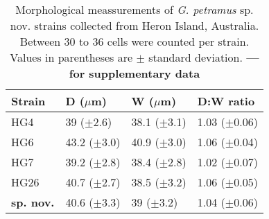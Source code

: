 \documentclass[12pt]{article}
\begin{document}
\FloatBarrier
\begin{table}
\caption{Morphological meassurements of \emph{G. petramus }sp. nov. strains collected from Heron Island, Australia. Between 30 to 36 cells were counted per strain. Values in parentheses are $\pm$ standard deviation. \textbf{--- for supplementary data}}
\label{tbl:SizeTable}
\begin{tabular}{ | p{2cm} | p{2.5cm} | p{2.5cm} | p{2.5cm} | }
\hline
 \textbf{Strain} & \textbf{D ($\mu$m)} & \textbf{W ($\mu$m)}  & \textbf{D:W ratio}  \\
 \hline
 HG4  & 39 ($\pm$2.6) & 38.1 ($\pm$3.1) & 1.03 ($\pm$0.06) \\

 HG6  & 43.2 ($\pm$3.0) & 40.9 ($\pm$3.0) & 1.06 ($\pm$0.04)  \\

 HG7  & 39.2 ($\pm$2.8) & 38.4 ($\pm$2.8) & 1.02 ($\pm$0.07)  \\

 HG26  & 40.7 ($\pm$2.7) & 38.5 ($\pm$3.2) & 1.06 ($\pm$0.05) \\
  \hline
\textbf{sp. nov.}  & 40.6 ($\pm$3.3) & 39 ($\pm$3.2) & 1.04 ($\pm$0.06) \\
 \hline
\end{tabular}
\end{table}
\FloatBarrier
\end{document}
